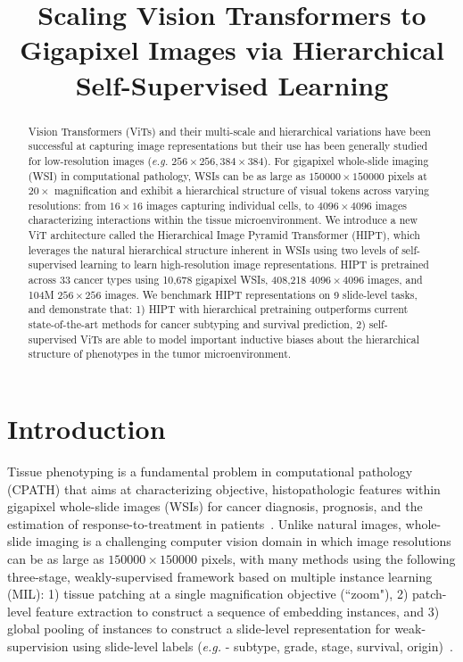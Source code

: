 \title{Scaling Vision Transformers to Gigapixel Images via Hierarchical Self-Supervised Learning}

\begin{abstract}
Vision Transformers (ViTs) and their multi-scale and hierarchical variations have been successful at capturing image representations but their use has been generally studied for low-resolution images (\textit{e.g.} $256 \times 256, 384 \times 384$). For gigapixel whole-slide imaging (WSI) in computational pathology, WSIs can be as large as $150000 \times 150000$ pixels at $20\times$ magnification and exhibit a hierarchical structure of visual tokens across varying resolutions: from $16 \times 16$ images capturing individual cells, to $4096 \times 4096$ images characterizing interactions within the tissue microenvironment. We introduce a new ViT architecture called the Hierarchical Image Pyramid Transformer (HIPT), which leverages the natural hierarchical structure inherent in WSIs using two levels of self-supervised learning to learn high-resolution image representations. HIPT is pretrained across 33 cancer types using 10,678 gigapixel WSIs, 408,218 $4096 \times 4096$ images, and 104M $256 \times 256$ images. We benchmark HIPT representations on 9 slide-level tasks, and demonstrate that: 1) HIPT with hierarchical pretraining outperforms current state-of-the-art methods for cancer subtyping and survival prediction, 2) self-supervised ViTs are able to model important inductive biases about the hierarchical structure of phenotypes in the tumor microenvironment.
\end{abstract}

\section{Introduction}
\label{sec:intro}

Tissue phenotyping is a fundamental problem in computational pathology (CPATH) that aims at characterizing objective, histopathologic features within gigapixel whole-slide images (WSIs) for cancer diagnosis, prognosis, and the estimation of response-to-treatment in patients~\cite{ludwig2005biomarkers, kather2016multi, javed2020cellular}. Unlike natural images, whole-slide imaging is a challenging computer vision domain in which image resolutions can be as large as $150000 \times 150000$ pixels, with many methods using the following three-stage, weakly-supervised framework based on multiple instance learning (MIL): 1) tissue patching at a single magnification objective (``zoom"), 2) patch-level feature extraction to construct a sequence of embedding instances, and 3) global pooling of instances to construct a slide-level representation for weak-supervision using slide-level labels (\textit{e.g.} - subtype, grade, stage, survival, origin)~\cite{hou2016patch, courtiol2019deep, van2019no, tellez2019neural, ilse2018attention, campanella2019clinical, lu2020data, zhu2017wsisa, lu2021ai}.

